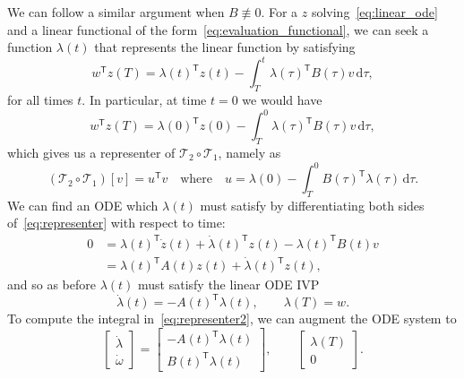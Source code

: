 \documentclass{article}
\begin{document}
We can follow a similar argument when $B \not \equiv 0$. For a $z$
solving~\eqref{eq:linear_ode} and a linear functional of the
form~\eqref{eq:evaluation_functional}, we can seek a function $\lambda(t)$
that represents the linear function by satisfying
\begin{equation}
    w^\mathsf{T} z(T) = \lambda(t)^\mathsf{T} z(t) - \int_T^t \lambda(\tau)^\mathsf{T} B(\tau) v \, \mathrm{d} \tau,
    \label{eq:representer}
\end{equation}
for all times $t$. In particular, at time $t=0$ we would have
\begin{equation}
    w^\mathsf{T} z(T) = \lambda(0)^\mathsf{T} z(0) - \int_T^0 \lambda(\tau)^\mathsf{T} B(\tau) v \, \mathrm{d} \tau,
\end{equation}
which gives us a representer of $\mathcal{T}_2 \circ \mathcal{T}_1$, namely as
\begin{equation}
    (\mathcal{T}_2 \circ \mathcal{T}_1)[v] = u^\mathsf{T} v
    \quad \text{where} \quad
    u = \lambda(0) - \int_T^0 B(\tau)^\mathsf{T} \lambda(\tau) \, \mathrm{d} \tau.
    \label{eq:representer2}
\end{equation}
We can find an ODE which $\lambda(t)$ must satisfy by
differentiating both sides of~\eqref{eq:representer} with respect to time:
\begin{align}
    0 &= \lambda(t)^\mathsf{T} \dot z(t) + \dot \lambda(t)^\mathsf{T} z(t) - \lambda(t)^\mathsf{T} B(t) v
    \\
    &= \lambda(t)^\mathsf{T} A(t) z(t) + \dot \lambda(t)^\mathsf{T} z(t),
\end{align}
and so as before $\lambda(t)$ must satisfy the linear ODE IVP
\begin{equation}
    \dot \lambda(t) = -A(t)^\mathsf{T} \lambda(t), \qquad \lambda(T) = w.
\end{equation}
To compute the integral in~\eqref{eq:representer2}, we can augment the ODE
system to
\begin{equation}
    \begin{bmatrix}
        \dot \lambda \\
        \dot \omega
    \end{bmatrix}
    =
    \begin{bmatrix}
        - A(t)^\mathsf{T} \lambda(t)
        \\
        B(t)^\mathsf{T} \lambda(t)
    \end{bmatrix},
    \qquad
    \begin{bmatrix}
        \lambda(T) \\
        0
    \end{bmatrix}.
\end{equation}
\end{document}
